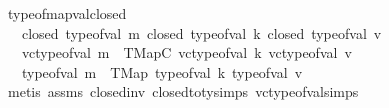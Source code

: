 \begin{isabellebody}
\endisatagproof
{\isafoldproof}%
%
\isadelimproof
\isanewline
%
\endisadelimproof
\isanewline
\isanewline
{}\isamarkupfalse%
\ type{\isacharunderscore}{\kern0pt}of{\isacharunderscore}{\kern0pt}mapval{\isacharunderscore}{\kern0pt}closed{\isacharcolon}{\kern0pt}\isanewline
\ \ \ {\isachardoublequoteopen}closed\ {\isacharparenleft}{\kern0pt}type{\isacharunderscore}{\kern0pt}of{\isacharunderscore}{\kern0pt}val\ m{\isacharparenright}{\kern0pt}{\isachardoublequoteclose}\ {\isachardoublequoteopen}closed\ {\isacharparenleft}{\kern0pt}type{\isacharunderscore}{\kern0pt}of{\isacharunderscore}{\kern0pt}val\ k{\isacharparenright}{\kern0pt}{\isachardoublequoteclose}\ {\isachardoublequoteopen}closed\ {\isacharparenleft}{\kern0pt}type{\isacharunderscore}{\kern0pt}of{\isacharunderscore}{\kern0pt}val\ v{\isacharparenright}{\kern0pt}{\isachardoublequoteclose}\isanewline
\ \ \ {\isachardoublequoteopen}vc{\isacharunderscore}{\kern0pt}type{\isacharunderscore}{\kern0pt}of{\isacharunderscore}{\kern0pt}val\ m\ {\isacharequal}{\kern0pt}\ TMapC\ {\isacharparenleft}{\kern0pt}vc{\isacharunderscore}{\kern0pt}type{\isacharunderscore}{\kern0pt}of{\isacharunderscore}{\kern0pt}val\ k{\isacharparenright}{\kern0pt}\ {\isacharparenleft}{\kern0pt}vc{\isacharunderscore}{\kern0pt}type{\isacharunderscore}{\kern0pt}of{\isacharunderscore}{\kern0pt}val\ v{\isacharparenright}{\kern0pt}{\isachardoublequoteclose}\isanewline
\ \ \ {\isachardoublequoteopen}type{\isacharunderscore}{\kern0pt}of{\isacharunderscore}{\kern0pt}val\ m\ {\isacharequal}{\kern0pt}\ TMap\ {\isacharparenleft}{\kern0pt}type{\isacharunderscore}{\kern0pt}of{\isacharunderscore}{\kern0pt}val\ k{\isacharparenright}{\kern0pt}\ {\isacharparenleft}{\kern0pt}type{\isacharunderscore}{\kern0pt}of{\isacharunderscore}{\kern0pt}val\ v{\isacharparenright}{\kern0pt}{\isachardoublequoteclose}\isanewline
%
\isadelimproof
\ \ %
\endisadelimproof
%
\isatagproof
{}\isamarkupfalse%
\ {\isacharparenleft}{\kern0pt}metis\ assms{\isacharparenleft}{\kern0pt}{}{\isacharcomma}{\kern0pt}{}{\isacharcomma}{\kern0pt}{}{\isacharcomma}{\kern0pt}{}{\isacharparenright}{\kern0pt}\ closed{\isacharunderscore}{\kern0pt}inv{}\ closed{\isacharunderscore}{\kern0pt}to{\isacharunderscore}{\kern0pt}ty{\isachardot}{\kern0pt}simps{\isacharparenleft}{\kern0pt}{}{\isacharparenright}{\kern0pt}\ vc{\isacharunderscore}{\kern0pt}type{\isacharunderscore}{\kern0pt}of{\isacharunderscore}{\kern0pt}val{\isachardot}{\kern0pt}simps{\isacharparenright}{\kern0pt}%

\end{isabellebody}
